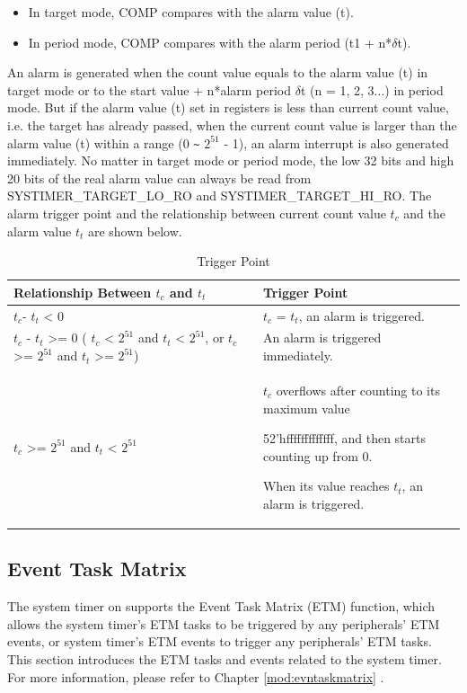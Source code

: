 \documentclass[main\_\_EN.tex]{subfiles}
\begin{document}
\begin{itemize}
        \item In target mode, COMP compares with the alarm value (t).
        \item In period mode, COMP compares with the alarm period (t1 + n*$\delta$t).
\end{itemize}

An alarm is generated when the count value equals to the alarm value (t) in target mode or to the start value + n*alarm period $\delta$t (n = 1, 2, 3...) in period mode. But if the alarm value (t) set in registers is less than current count value, i.e. the target has already passed, when the current count value is larger than the alarm value (t) within a range (0 \verb+~+ $2^{51}$ - 1), an alarm interrupt is also generated immediately. No matter in target mode or period mode, the low 32 bits and high 20 bits of the real alarm value can always be read from SYSTIMER\_TARGET\_LO\_RO and  SYSTIMER\_TARGET\_HI\_RO. The alarm trigger point and the relationship between current count value $t_{c}$ and the alarm value $t_{t}$ are shown below.

\begin{longtable}[c]{ | p{5cm} | p{7.5cm} |}
\caption{Trigger Point}\\\hline
\rowcolor{lightgray}
\textbf{Relationship Between $t_{c}$ and $t_{t}$} & \textbf{Trigger Point}\\ \hline
\endhead
$t_{c}$- $t_{t}$ < 0 & $t_{c}$ = $t_{t}$, an alarm is triggered.\\ \hline
$t_{c}$ - $t_{t}$ >= 0 \newline ( $t_{c}$ < $2^{51}$ and $t_{t}$ < $2^{51}$, \newline or $t_{c}$ >= $2^{51}$ and $t_{t}$ >= $2^{51}$) & An alarm is triggered immediately. \\ \hline
\multirow{3}{*}{
$t_{c}$ >= $2^{51}$ and $t_{t}$ < $2^{51}$} &

$t_{c}$ overflows after counting to its maximum value

52'hfffffffffffff, and then starts counting up from 0.

When its value reaches $t_{t}$, an alarm is triggered. \\ \hline
\end{longtable}


\subsection{Event Task Matrix}
The system timer on \chipname{} supports the Event Task Matrix (ETM) function, which allows the system timer's ETM tasks to be triggered by any peripherals' ETM events, or system timer's ETM events to trigger any peripherals' ETM tasks. This section introduces the ETM tasks and events related to the system timer. For more information, please refer to Chapter \ref{mod:evntaskmatrix} .
\end{document}
